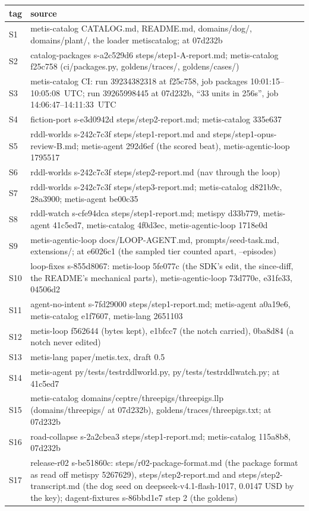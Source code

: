 \documentclass[11pt]{article}
\newcommand{\tool}[1]{{\ttfamily\begingroup\def\_{\textunderscore\allowbreak}#1\endgroup}}
\begin{document}
\begin{small}\noindent
\begin{tabularx}{\textwidth}{@{}lX@{}}
\toprule
tag & source \\
\midrule
S1 & metis-catalog \tool{CATALOG.md}, \tool{README.md}, \tool{domains/dog/}, \tool{domains/plant/}, the loader \tool{metis\_catalog}; at 07d232b \\
S2 & catalog-packages s-a2c529d6 \tool{steps/step1-A-report.md}; metis-catalog f25c758 (\tool{ci/packages.py}, \tool{goldens/traces/}, \tool{goldens/cases/}) \\
S3 & metis-catalog CI: run 39234382318 at f25c758, job \tool{packages} 10:01:15--10:05:08~UTC; run 39265998445 at 07d232b, ``33 units in 256s'', job 14:06:47--14:11:33~UTC \\
S4 & fiction-port s-e3d0942d \tool{steps/step2-report.md}; metis-catalog 335e637 \\
S5 & rddl-worlds s-242c7c3f \tool{steps/step1-report.md} and \tool{steps/step1-opus-review-B.md}; metis-agent 292d6ef (the scored beat), metis-agentic-loop 1795517 \\
S6 & rddl-worlds s-242c7c3f \tool{steps/step2-report.md} (nav through the loop) \\
S7 & rddl-worlds s-242c7c3f \tool{steps/step3-report.md}; metis-catalog d821b9c, 28a3900; metis-agent be00c35 \\
S8 & rddl-watch s-cfe94dca \tool{steps/step1-report.md}; metispy d33b779, metis-agent 41c5ed7, metis-catalog 4f0d3ec, metis-agentic-loop 1718e0d \\
S9 & metis-agentic-loop \tool{docs/LOOP-AGENT.md}, \tool{prompts/seed-task.md}, \tool{extensions/}; at e6026c1 (the sampled tier counted apart, \tool{--episodes}) \\
S10 & loop-fixes s-855d8067: metis-loop 5fe077c (the SDK's edit, the since-diff, the README's mechanical parts), metis-agentic-loop 73d770e, e31fe33, 04506d2 \\
S11 & agent-no-intent s-7fd29000 \tool{steps/step1-report.md}; metis-agent a0a19e6, metis-catalog e1f7607, metis-lang 2651103 \\
S12 & metis-loop f562644 (bytes kept), e1bfcc7 (the notch carried), 0ba8d84 (a notch never edited) \\
S13 & metis-lang \tool{paper/metis.tex}, draft 0.5 \\
S14 & metis-agent \tool{py/tests/test\_rddl\_world.py}, \tool{py/tests/test\_rddl\_watch.py}; at 41c5ed7 \\
S15 & metis-catalog \tool{domains/ceptre/three\_pigs/three\_pigs.llp} (\tool{domains/three\_pigs/} at 07d232b), \tool{goldens/traces/three\_pigs.txt}; at 07d232b \\
S16 & road-collapse s-2a2cbea3 \tool{steps/step1-report.md}; metis-catalog 115a8b8, 07d232b \\
S17 & release-r02 s-be51860c: \tool{steps/r02-package-format.md} (the package format as read off metispy 5267629), \tool{steps/step2-report.md} and \tool{steps/step2-transcript.md} (the dog seed on deepseek-v4.1-flash-1017, 0.0147 USD by the key); dagent-fixtures s-86bbd1e7 step 2 (the goldens) \\
\bottomrule
\end{tabularx}
\end{small}
\end{document}
